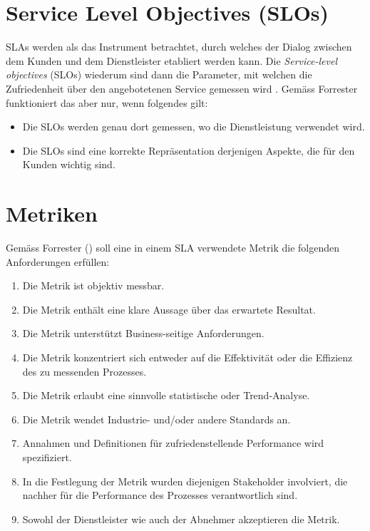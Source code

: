 \documentclass[11pt,listof=totoc]{scrreprt} %
\theoremstyle{definition}
\begin{document}
\section{Service Level Objectives (SLOs)}

SLAs werden als das Instrument betrachtet, durch welches der Dialog zwischen dem Kunden und dem Dienstleister etabliert werden kann. Die {\em Service-level objectives} (SLOs) wiederum sind dann die Parameter, mit welchen die Zufriedenheit über den angebotetenen Service gemessen wird \cite{forrester:slaBestPractices}. Gemäss Forrester funktioniert das aber nur, wenn folgendes gilt:

\begin{itemize}
\item Die SLOs werden genau dort gemessen, wo die Dienstleistung verwendet wird.
\item Die SLOs sind eine korrekte Repräsentation derjenigen Aspekte, die für den Kunden wichtig sind.
\end{itemize}

\section{Metriken}

Gemäss Forrester (\cite{forrester:slaBestPractices}) soll eine in einem SLA verwendete Metrik die folgenden Anforderungen erfüllen:

\begin{enumerate}
\item Die Metrik ist objektiv messbar.
\item Die Metrik enthält eine klare Aussage über das erwartete Resultat.
\item Die Metrik unterstützt Business-seitige Anforderungen.
\item Die Metrik konzentriert sich entweder auf die Effektivität oder die Effizienz des zu messenden Prozesses.
\item Die Metrik erlaubt eine sinnvolle statistische oder Trend-Analyse.
\item Die Metrik wendet Industrie- und/oder andere Standards an.
\item Annahmen und Definitionen für zufriedenstellende Performance wird spezifiziert.
\item In die Festlegung der Metrik wurden diejenigen Stakeholder involviert, die nachher für die Performance des Prozesses verantwortlich sind.
\item Sowohl der Dienstleister wie auch der Abnehmer akzeptieren die Metrik.
\end{enumerate}
\end{document}
